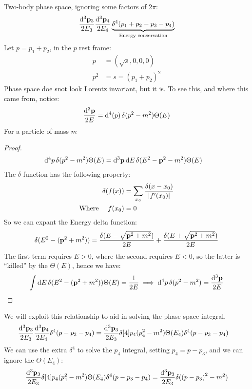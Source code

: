 Two-body phase space, ignoring some factors of $2\pi$:
\begin{align*}
  \frac{\dd[3]{\vb{p}_3}}{2E_3}\frac{\dd[3]{\vb{p}_4}}{2E_4}
  \underbrace{\delta^4(p_1+p_2-p_3-p_4)}_{\text{Energy conservation}}
\end{align*}
Let $p=p_1+p_2$, in the $p$ rest frame:
\begin{align*}
  p&=(\sqrt{s},0,0,0)\\
  p^2&=s={(p_1+p_2)}^2
\end{align*}
Phase space doe snot look Lorentz invariant, but it is. To see this, and where this came from, notice:
\begin{align*}
  \frac{\dd[3]{\vb{p}}}{2E}=\dd[4](p)\delta(p^2-m^2)\Theta(E)
\end{align*}
For a particle of mass $m$
\begin{proof}
  \begin{align*}
    \dd[4]{p}\delta(p^2-m^2)\Theta(E)
    &=\dd[3]{\vb{p}}\dd{E}\delta(E^2-\vb{p}^2-m^2)\Theta(E)
  \end{align*}
  The $\delta$ function has the following property:
  \begin{align*}
    \delta(f(x))&=\sum_{x_0}\frac{\delta(x-x_0)}{\abs{f'(x_0)}}\\
    \text{Where }\quad f(x_0)&=0
  \end{align*}
  So we can expant the Energy delta function:
  \begin{align*}
    \delta(E^2-(\vb{p}^2+m^2))=
    \frac{\delta(E-\sqrt{\vb{p}^2+m^2})}{2E}+
    \frac{\delta(E+\sqrt{\vb{p}^2+m^2})}{2E}
  \end{align*}
  The first term requires $E>0$, where the second requires $E<0$, so the latter is ``killed'' by the $\Theta(E)$, hence we have:
  \begin{align*}
    \int\dd{E}\delta(E^2-(\vb{p}^2+m^2))\Theta(E)=\frac1{2E}
    \implies\dd[4]{p}\delta(p^2-m^2)=\frac{\dd[3]{\vb{p}}}{2E}
  \end{align*}
\end{proof}
We will exploit this relationship to aid in solving the phase-space integral.
\begin{align*}
  \frac{\dd[3]{\vb{p}_3}}{2E_3}\frac{\dd[3]{\vb{p}_4}}{2E_4}\delta^4(p-p_3-p_4)
  &=\frac{\dd[3]{\vb{p}_3}}{2E_3}\delta[4]{p_4}(p_4^2-m^2)\Theta(E_4)
  \delta^4(p-p_3-p_4)
\end{align*}
We can use the extra $\delta^4$ to solve the $p_4$ integral, setting $p_4=p-p_3$, and we can ignore the $\Theta(E_4)$:
\begin{align*}
  \frac{\dd[3]{\vb{p}_3}}{2E_3}\delta[4]{p_4}(p_4^2-m^2)\Theta(E_4)
  \delta^4(p-p_3-p_4)
  =\frac{\dd[3]{\vb{p}_3}}{2E_3}\delta({(p-p_3)}^2-m^2)
\end{align*}
